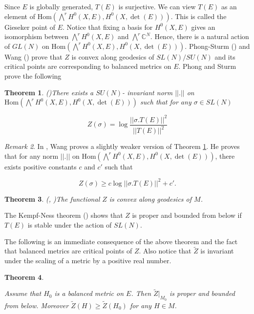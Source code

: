 \documentclass[12pt,oneside,notitlepage]{amsart}
\newtheorem{thm}{Theorem}[section]
\theoremstyle{definition}
\theoremstyle{remark}
\newtheorem{rem}[thm]{Remark}
\numberwithin{equation}{section}
\begin{document}
Since $E$ is globally generated, $T(E)$ is surjective. We can view
$T(E)$ as an element of
$\textrm{Hom}(\bigwedge^{r}H^{0}(X,E),H^{0}(X,\det(E)))$. This is
called the Gieseker point of $E$. Notice that fixing a basis for
$H^0(X,E)$ gives an isomorphism between $\bigwedge^{r}H^{0}(X,E)$
and $\bigwedge^r\mathbb{C}^N$. Hence, there is a natural action of
$GL(N)$ on
$\textrm{Hom}(\bigwedge^{r}H^{0}(X,E),H^{0}(X,\det(E)))$.
Phong-Sturm (\cite{PS}) and Wang (\cite{W}) prove that $Z$ is
convex along geodesics of $SL(N)/SU(N)$ and its critical points
are corresponding to balanced metrics on $E$. Phong and Sturm
prove the following

\begin{thm}(\cite [Theorem 2]{PS})\label{secondthm}
There exists a $SU(N)$- invariant norm $||.||$ on
$\textrm{Hom}(\bigwedge^{r}H^{0}(X,E),H^{0}(X,\det(E)))$ such that
for any $\sigma \in SL(N)$

$$Z(\sigma)= \log \frac{||\sigma .
T(E)||^2}{||T(E)||^2}$$

\end{thm}

\begin{rem}

In \cite{W}, Wang proves a slightly weaker version of Theorem
\ref{secondthm}. He proves that for any norm $||.||$ on
$\textrm{Hom}(\bigwedge^{r}H^{0}(X,E),H^{0}(X,\det(E)))$, there
exists positive constants $c$ and $c'$ such that

$$Z(\sigma) \geq c\log ||\sigma .
T(E)||^2 +c'. $$

\end{rem}

\begin{thm}(\cite[Lemma 3.5]{W},  \cite[Lemma 2.2]{PS})\label{thirdthm}
The functional $Z$ is convex along geodesics of $M$.

\end{thm}

The Kempf-Ness theorem (\cite{KN}) shows that $Z$ is proper and
bounded from below if $T(E)$ is stable under the action of
$SL(N)$.

The following is an immediate consequence of the above theorem and
the fact that balanced metrics are critical points of $Z$. Also
notice that $\widetilde{Z}$ is invariant under the scaling of a
metric by a positive real number.

\begin{thm}\label{fourththm}

Assume that $H_{0}$ is a balanced metric on $E$. Then
$\widetilde{Z}|_{M_{0}}$ is proper and bounded from below.
Moreover $\widetilde{Z}(H)\geq \widetilde{Z}(H_{0})$ for any $H
\in M$.

\end{thm}
\end{document}
